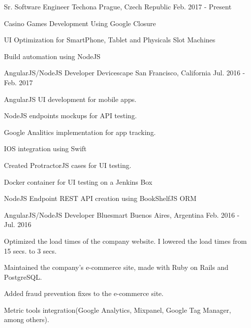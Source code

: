 

\begin{cventries}

 \cventry
      {Sr. Software Engineer} %
      {Techona} %
      {Prague, Czech Republic} %
      {Feb. 2017 - Present} %
      {
        \begin{cvitems} %
          \item {Casino Games Development Using Google Closure}
          \item {UI Optimization for SmartPhone, Tablet and Physicals Slot Machines}
          \item {Build automation using NodeJS}
        \end{cvitems}
      }

  \cventry
      {AngularJS/NodeJS Developer} %
      {Devicescape} %
      {San Francisco, California} %
      {Jul. 2016 - Feb. 2017} %
      {
        \begin{cvitems} %
          \item {AngularJS UI development for mobile apps.}
          \item {NodeJS endpoints mockups for API testing.}
          \item {Google Analitics implementation for app tracking.}
          \item {IOS integration using Swift}
          \item {Created ProtractorJS cases for UI testing.}
          \item {Docker container for UI testing on a Jenkins Box}
          \item {NodeJS Endpoint REST API creation using BookShelfJS ORM}
        \end{cvitems}
      }


  \cventry
    {AngularJS/NodeJS Developer} %
    {Bluesmart} %
    {Buenos Aires, Argentina} %
    {Feb. 2016 - Jul. 2016} %
    {
      \begin{cvitems} %
        \item {Optimized the load times of the company website. I lowered the load times from 15 secs. to 3 secs.}
        \item {Maintained the company's e-commerce site, made with Ruby on Rails and PostgreSQL.}
        \item {Added fraud prevention fixes to the e-commerce site.}
        \item {Metric tools integration(Google Analytics, Mixpanel, Google Tag Manager, among others).}
      \end{cvitems}
    }


\end{cventries}

